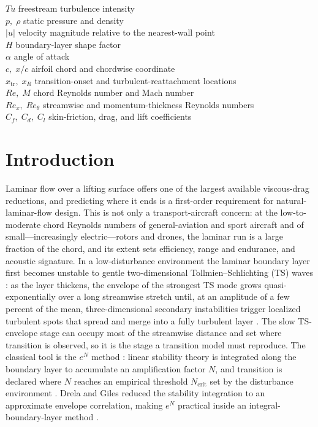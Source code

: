 \documentclass[journal]{new-aiaa}
\begin{document}
\begin{tabbing}
  $Tu$ \> freestream turbulence intensity \\
  $p,\;\rho$ \> static pressure and density \\
  $|u|$ \> velocity magnitude relative to the nearest-wall point \\
  $H$ \> boundary-layer shape factor \\
  $\alpha$ \> angle of attack \\
  $c,\;x/c$ \> airfoil chord and chordwise coordinate \\
  $x_\mathrm{tr},\;x_R$ \> transition-onset and turbulent-reattachment locations \\
  $Re,\;M$ \> chord Reynolds number and Mach number \\
  $Re_x,\;Re_\theta$ \> streamwise and momentum-thickness Reynolds numbers \\
  $C_f,\;C_d,\;C_l$ \> skin-friction, drag, and lift coefficients \\
\end{tabbing}

\section{Introduction}

Laminar flow over a lifting surface offers one of the largest available
viscous-drag reductions, and predicting where it ends is a first-order requirement
for natural-laminar-flow design. This is not only a transport-aircraft concern:
at the low-to-moderate chord Reynolds numbers of general-aviation and sport
aircraft and of small---increasingly electric---rotors and drones, the laminar run
is a large fraction of the chord, and its extent sets efficiency, range and
endurance, and acoustic signature.
In a low-disturbance environment the laminar boundary layer first becomes
unstable to gentle two-dimensional Tollmien--Schlichting (TS) waves
\cite{mack_1977,schmid_henningson_2001}: as the layer thickens, the envelope of the
strongest TS mode grows quasi-exponentially over a long streamwise stretch until,
at an amplitude of a few percent of the mean, three-dimensional secondary
instabilities trigger localized turbulent spots that spread and merge into a fully
turbulent layer \cite{schubauer_klebanoff_1956,schmid_henningson_2001}. The slow
TS-envelope stage can occupy most of the streamwise distance and set
where transition is observed, so it is the stage a transition model must reproduce.
The classical tool is the $e^N$ method \cite{smith_gamberoni_1956, vaningen_2008}:
linear stability theory is integrated along the boundary layer to accumulate an
amplification factor $N$, and transition is declared where $N$ reaches an empirical
threshold $N_\mathrm{crit}$ set by the disturbance environment \cite{mack_1977}.
Drela and Giles reduced the stability integration to an approximate envelope
correlation, making $e^N$ practical inside an integral-boundary-layer method
\cite{drela_giles_1987, drela_xfoil_1989}.
\end{document}
